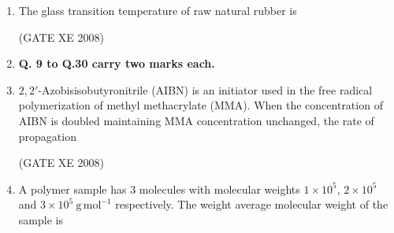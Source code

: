 \documentclass[12pt]{article}
\begin{document}
\begin{enumerate}
 (GATE XE 2008)

\item The glass transition temperature of raw natural rubber is  

\begin{enumerate}
\end{enumerate}

(GATE XE 2008)

\item[] \textbf{Q. 9 to Q.30 carry two marks each.}


\item $2,2'$-Azobisisobutyronitrile (AIBN) is an initiator used in the free radical polymerization of methyl methacrylate (MMA). When the concentration of AIBN is doubled maintaining MMA concentration unchanged, the rate of propagation  

\begin{enumerate}
\end{enumerate}

(GATE XE 2008)

\item A polymer sample has $3$ molecules with molecular weights $1\times 10^5$, $2\times 10^5$ and $3\times 10^5~\mathrm{g\,mol^{-1}}$ respectively. The weight average molecular weight of the sample is  

\begin{enumerate}
\end{enumerate}


\end{enumerate}
\end{document}
